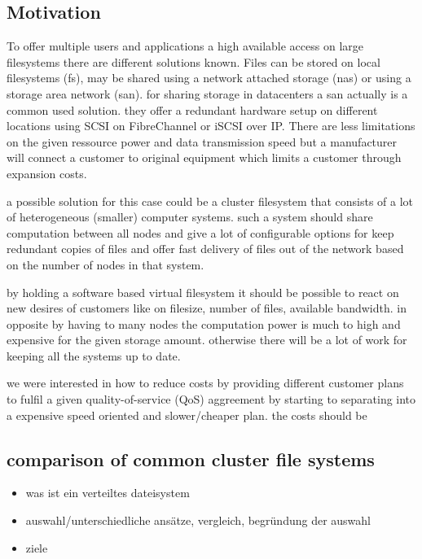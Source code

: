 
\subsection{Motivation}

To offer multiple users and applications a high available access on large filesystems there are different solutions known. Files can be stored on local filesystems (fs), may be shared using a network attached storage (nas)  or using a storage area network (san). for sharing storage in datacenters a san actually is a common used solution. they offer a redundant hardware setup on different locations using SCSI on FibreChannel or iSCSI over IP.
There are less limitations on the given ressource power and data transmission speed but a manufacturer will connect a customer to original equipment which limits a customer through expansion costs.

a possible solution for this case could be a cluster filesystem that consists of a lot of heterogeneous (smaller) computer systems. such a system should share computation between all nodes and give a lot of configurable options for keep redundant copies of files and offer fast delivery of files out of the network based on the number of nodes in that system.

by holding a software based virtual filesystem it should be possible to react on new desires of customers like on filesize, number of files, available bandwidth. in opposite by having to many nodes the computation power is much to high and expensive for the given storage amount.  otherwise there will be a lot of work for keeping all the systems up to date. 

we were interested in how to reduce costs by providing different customer plans to fulfil a given quality-of-service (QoS) aggreement by starting to separating into a expensive speed oriented and slower/cheaper plan. the costs should be 

\subsection{comparison of common cluster file systems}

\begin{itemize}
\item was ist ein verteiltes dateisystem
\item auswahl/unterschiedliche ansätze, vergleich, begründung der auswahl
\item ziele
\end{itemize}

